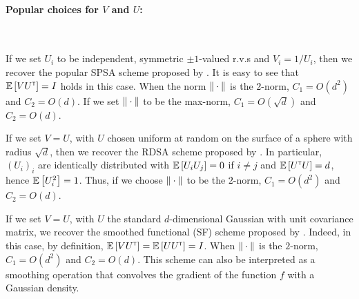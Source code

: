 \paragraph{Popular choices for $V$ and $U$:}\ \\
\begin{inparaenum}[$\bullet$]
 \item If we set $U_i$ to be independent, symmetric $\pm 1$-valued r.v.s and $V_i = 1/U_i$, then we recover the popular SPSA scheme proposed by \cite{spall1992multivariate}.
It is easy to see that $\mathbb{E}\left[  V U^\mathsf{\scriptscriptstyle T} \right] = I$ holds in this case.
 When the norm $\|\cdot\|$ is the $2$-norm, $C_1 = O(d^2)$ and $C_2 = O(d)$. If we set $\|\cdot\|$ to be the max-norm, $C_1 = O(\sqrt{d})$ and $C_2 = O(d)$.\\
 \item If we set $V=U$, with $U$ chosen uniform at random on the surface of a sphere with radius $\sqrt{d}$, 
 then we recover the RDSA scheme proposed by  \citeauthor{kushcla} \citep[cf. pp.~58--60][]{kushcla}. 
 In particular, $(U_i)_i$ are identically distributed with $\mathbb{E}\left[ U_i U_j \right] = 0$ if $i\ne j$ and $\mathbb{E}\left[ U^\mathsf{\scriptscriptstyle T} U \right] = d$, hence $\mathbb{E}\left[U_i^2\right] = 1$. Thus, if we choose $\|\cdot\|$ to be the $2$-norm, $C_1 = O( d^2 )$ and $C_2 = O(d)$.
 \\
 \item If we set $V=U$, with $U$ the standard $d$-dimensional Gaussian with unit covariance matrix, we recover the smoothed functional (SF) scheme proposed by \cite{katkul}. 
Indeed, in this case, by definition, $\mathbb{E}\left[VU^\mathsf{\scriptscriptstyle T}\right] = \mathbb{E}\left[U U^\mathsf{\scriptscriptstyle T} \right] = I$.
When $\|\cdot\|$ is the $2$-norm, $C_1 = O(d^2)$
 and $C_2 = O( d)$.
 This scheme can also be interpreted as a smoothing operation that  convolves the gradient of the function $f$ with a Gaussian density.
\end{inparaenum}

